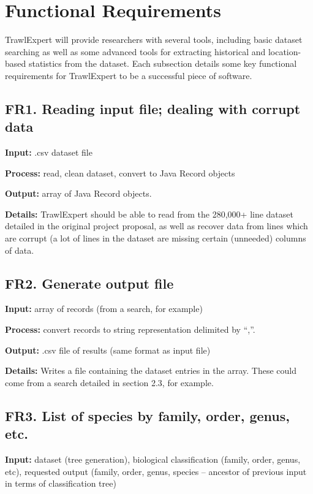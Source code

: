 \documentclass{article}
\begin{document}
\section{Functional Requirements}
TrawlExpert will provide researchers with several tools, including basic dataset searching as well as some advanced tools for extracting historical and location-based statistics from the dataset. Each subsection details some key functional requirements for TrawlExpert to be a successful piece of software.

\subsection{FR1. Reading input file; dealing with corrupt data}
\noindent \textbf{Input:} .csv dataset file

\noindent \textbf{Process:} read, clean dataset, convert to Java Record objects

\noindent \textbf{Output:} array of Java Record objects.

\noindent \textbf{Details:} TrawlExpert should be able to read from the 280,000+ line dataset detailed in the original project proposal, as well as recover data from lines which are corrupt (a lot of lines in the dataset are missing certain (unneeded) columns of data.

\subsection{FR2. Generate output file}
\noindent \textbf{Input:} array of records (from a search, for example)

\noindent \textbf{Process:} convert records to string representation delimited by ``,''.

\noindent \textbf{Output:} .csv file of results (same format as input file)

\noindent \textbf{Details:} Writes a file containing the dataset entries in the array. These could come from a search detailed in section 2.3, for example.

\subsection{FR3. List of species by family, order, genus, etc.}
\noindent \textbf{Input:} dataset (tree generation), biological classification (family, order, genus, etc), requested output (family, order, genus, species -- ancestor of previous input in terms of classification tree)
\end{document}
